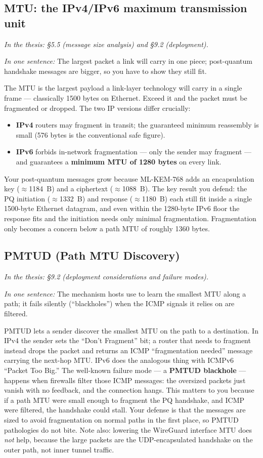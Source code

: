 \documentclass[11pt]{article}
\newcommand{\seethesis}[1]{%
  {\small\color{softgray}\textit{In the thesis: #1}}\par\vspace{3pt}}
\newcommand{\nutshell}[1]{\noindent\textit{In one sentence:} #1\par\vspace{4pt}}
\begin{document}
\subsection{MTU: the IPv4/IPv6 maximum transmission unit}
\seethesis{\S5.5 (message size analysis) and \S9.2 (deployment).}
\nutshell{The largest packet a link will carry in one piece; post-quantum
handshake messages are bigger, so you have to show they still fit.}

The MTU is the largest payload a link-layer technology will carry in a single
frame --- classically 1500 bytes on Ethernet. Exceed it and the packet must be
fragmented or dropped. The two IP versions differ crucially:
\begin{itemize}
  \item \textbf{IPv4} routers may fragment in transit; the guaranteed minimum
  reassembly is small (576 bytes is the conventional safe figure).
  \item \textbf{IPv6} forbids in-network fragmentation --- only the sender may
  fragment --- and guarantees a \textbf{minimum MTU of 1280 bytes} on every
  link.
\end{itemize}
Your post-quantum messages grow because ML-KEM-768 adds an encapsulation key
($\approx$1184~B) and a ciphertext ($\approx$1088~B). The key result you defend:
the PQ initiation ($\approx$1332~B) and response ($\approx$1180~B) each still fit
inside a single 1500-byte Ethernet datagram, and even within the 1280-byte IPv6
floor the response fits and the initiation needs only minimal fragmentation.
Fragmentation only becomes a concern below a path MTU of roughly 1360 bytes.

\subsection{PMTUD (Path MTU Discovery)}
\seethesis{\S9.2 (deployment considerations and failure modes).}
\nutshell{The mechanism hosts use to learn the smallest MTU along a path; it
fails silently (``blackholes'') when the ICMP signals it relies on are
filtered.}

PMTUD lets a sender discover the smallest MTU on the path to a destination.
In IPv4 the sender sets the ``Don't Fragment'' bit; a router that needs to
fragment instead drops the packet and returns an ICMP ``fragmentation needed''
message carrying the next-hop MTU. IPv6 does the analogous thing with ICMPv6
``Packet Too Big.'' The well-known failure mode --- a \textbf{PMTUD blackhole}
--- happens when firewalls filter those ICMP messages: the oversized packets
just vanish with no feedback, and the connection hangs. This matters to you
because if a path MTU were small enough to fragment the PQ handshake, and ICMP
were filtered, the handshake could stall. Your defense is that the messages are
sized to avoid fragmentation on normal paths in the first place, so PMTUD
pathologies do not bite. Note also: lowering the WireGuard interface MTU does
\emph{not} help, because the large packets are the UDP-encapsulated handshake on
the outer path, not inner tunnel traffic.
\end{document}
